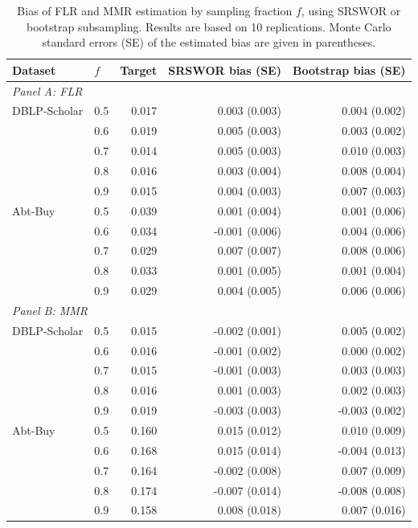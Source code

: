\begin{table}[ht]
\centering
\caption{Bias of FLR and MMR estimation by sampling fraction $f$, using SRSWOR
or bootstrap subsampling. Results are based on 10 replications. Monte Carlo standard
errors (SE) of the estimated bias are given in parentheses.}
\label{tab:subsample-bias}
\begin{tabular}{llrrr}
\toprule
Dataset & $f$ & Target & SRSWOR bias (SE) & Bootstrap bias (SE) \\
\midrule
\multicolumn{5}{l}{\textit{Panel A: FLR}} \\[2pt]

DBLP-Scholar
& 0.5 & 0.017 & 0.003 (0.003) & 0.004 (0.002) \\
& 0.6 & 0.019 & 0.005 (0.003) & 0.003 (0.002) \\
& 0.7 & 0.014 & 0.005 (0.003) & 0.010 (0.003) \\
& 0.8 & 0.016 & 0.003 (0.004) & 0.008 (0.004) \\
& 0.9 & 0.015 & 0.004 (0.003) & 0.007 (0.003) \\

\addlinespace
Abt-Buy
& 0.5 & 0.039 &  0.001 (0.004) & 0.001 (0.006) \\
& 0.6 & 0.034 & -0.001 (0.006) & 0.004 (0.006) \\
& 0.7 & 0.029 &  0.007 (0.007) & 0.008 (0.006) \\
& 0.8 & 0.033 &  0.001 (0.005) & 0.001 (0.004) \\
& 0.9 & 0.029 &  0.004 (0.005) & 0.006 (0.006) \\

\midrule
\multicolumn{5}{l}{\textit{Panel B: MMR}} \\[2pt]

DBLP-Scholar
& 0.5 & 0.015 & -0.002 (0.001) &  0.005 (0.002) \\
& 0.6 & 0.016 & -0.001 (0.002) &  0.000 (0.002) \\
& 0.7 & 0.015 & -0.001 (0.003) &  0.003 (0.003) \\
& 0.8 & 0.016 &  0.001 (0.003) &  0.002 (0.003) \\
& 0.9 & 0.019 & -0.003 (0.003) & -0.003 (0.002) \\

\addlinespace
Abt-Buy
& 0.5 & 0.160 &  0.015 (0.012) &  0.010 (0.009) \\
& 0.6 & 0.168 &  0.015 (0.014) & -0.004 (0.013) \\
& 0.7 & 0.164 & -0.002 (0.008) &  0.007 (0.009) \\
& 0.8 & 0.174 & -0.007 (0.014) & -0.008 (0.008) \\
& 0.9 & 0.158 &  0.008 (0.018) &  0.007 (0.016) \\

\bottomrule
\end{tabular}
\end{table}

